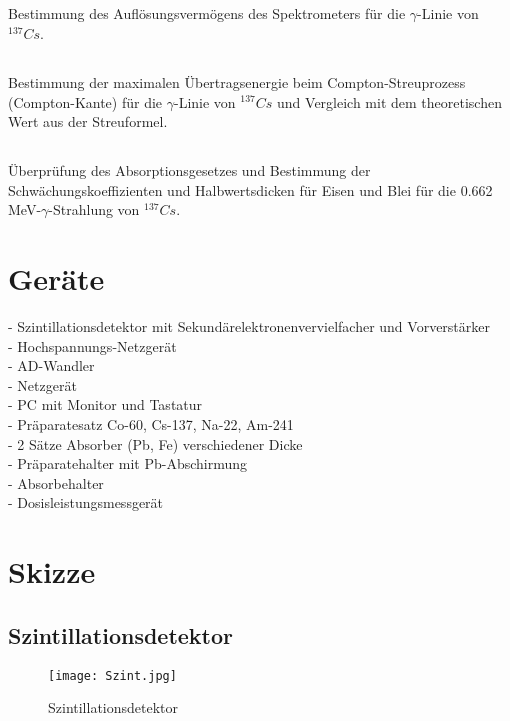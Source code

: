 \documentclass[11pt,a4paper]{article}
\begin{document}
\subsection{}
Bestimmung des Auflösungsvermögens des Spektrometers für die $\gamma$-Linie von $^{137}Cs$.
\subsection{}
Bestimmung der maximalen Übertragsenergie beim Compton-Streuprozess (Compton-Kante)
für die $\gamma$-Linie von $^{137}Cs$ und Vergleich mit dem theoretischen Wert aus der Streuformel.
\subsection{}
Überprüfung des Absorptionsgesetzes und Bestimmung der Schwächungskoeffizienten
und Halbwertsdicken für Eisen und Blei für die 0.662 MeV-$\gamma$-Strahlung von $^{137}Cs$.


\section{Geräte}
- Szintillationsdetektor mit Sekundärelektronenvervielfacher und Vorverstärker
\\- Hochspannungs-Netzgerät 
\\- AD-Wandler
\\- Netzgerät
\\- PC mit Monitor und Tastatur
\\- Präparatesatz Co-60, Cs-137, Na-22, Am-241
\\- 2 Sätze Absorber (Pb, Fe) verschiedener Dicke
\\- Präparatehalter mit Pb-Abschirmung
\\- Absorbehalter
\\- Dosisleistungsmessgerät

\section{Skizze}
\subsection{Szintillationsdetektor}
\begin{figure}[htbp] 
  \centering
\texttt{[image: Szint.jpg]}
  \caption{Szintillationsdetektor}
  \label{fig:Bild1}
\end{figure}
\end{document}
